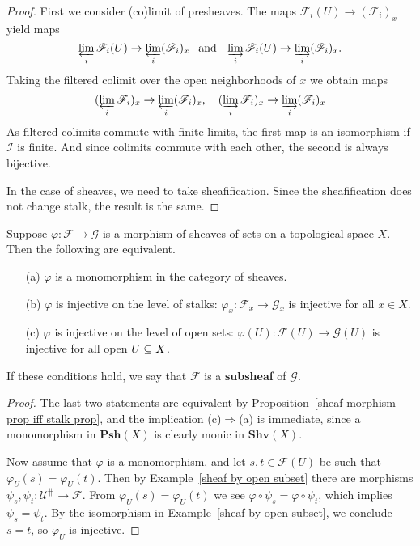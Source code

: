 \begin{proof}
First we consider (co)limit of presheaves. The maps $\mathscr{F}_i(U)\to(\mathscr{F}_i)_x$ yield maps \[\varprojlim\limits_i\mathscr{F}_i(U)\to\varprojlim\limits_i(\mathscr{F}_i)_x\hspace{8pt}\text{and}\hspace{8pt} \varinjlim\limits_i\mathscr{F}_i(U)\to\varinjlim\limits_i(\mathscr{F}_i)_x.\] 
Taking the filtered colimit over the open neighborhoods of $x$ we obtain maps
\[(\varprojlim\limits_i\mathscr{F}_i)_x\to\varprojlim\limits_i(\mathscr{F}_i)_x,\quad (\varinjlim\limits_i\mathscr{F}_i)_x\to\varinjlim\limits_i(\mathscr{F}_i)_x\]
As filtered colimits commute with finite limits, the first map is an isomorphism if $\mathcal{I}$ is finite. And since colimits commute with each other, the second is always bijective.\par
In the case of sheaves, we need to take sheafification. Since the sheafification does not change stalk, the result is the same.
\end{proof}
\begin{proposition}\label{sheaf cat monomorphism iff}
Suppose $\varphi:\mathscr{F}\to\mathscr{G}$ is a morphism of sheaves of sets on a topological space $X$. Then the following are equivalent.
\begin{itemize}
\item[(a)] $\varphi$ is a monomorphism in the category of sheaves.
\item[(b)] $\varphi$ is injective on the level of stalks: $\varphi_x:\mathscr{F}_x\to\mathscr{G}_x$ is injective for all $x\in X$.
\item[(c)] $\varphi$ is injective on the level of open sets: $\varphi(U):\mathscr{F}(U)\to\mathscr{G}(U)$ is injective for all open $U\subseteq X$.
\end{itemize}
If these conditions hold, we say that $\mathscr{F}$ is a \textbf{subsheaf} of $\mathscr{G}$.
\end{proposition}
\begin{proof}
The last two statements are equivalent by Proposition~\ref{sheaf morphism prop iff stalk prop}, and the implication (c)$\Rightarrow$(a) is immediate, since a monomorphism in $\mathbf{Psh}(X)$ is clearly monic in $\mathbf{Shv}(X)$.\par 
Now assume that $\varphi$ is a monomorphism, and let $s,t\in\mathscr{F}(U)$ be such that $\varphi_U(s)=\varphi_U(t)$. Then by Example~\ref{sheaf by open subset} there are morphisms $\psi_s,\psi_t:\mathscr{U}^{\hash}\to\mathscr{F}$. From $\varphi_U(s)=\varphi_U(t)$ we see $\varphi\circ\psi_s=\varphi\circ\psi_t$, which implies $\psi_s=\psi_t$. By the isomorphism in Example~\ref{sheaf by open subset}, we conclude $s=t$, so $\varphi_U$ is injective.
\end{proof}
